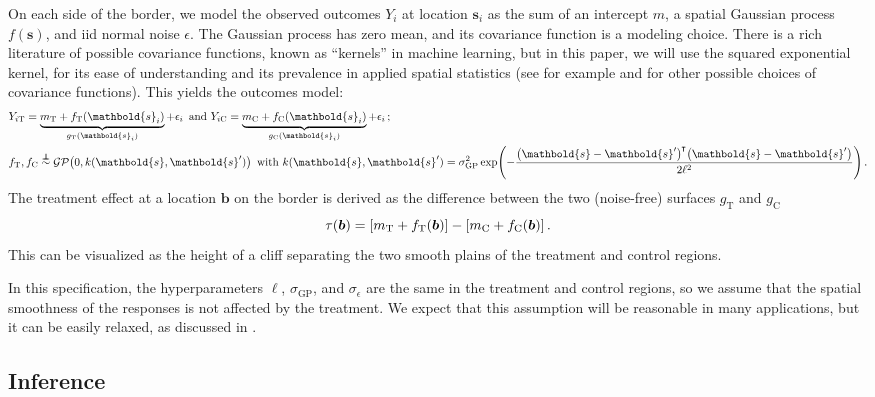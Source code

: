 \documentclass[letter,12pt]{article}
\DeclarePairedDelimiter{\parenthesis}{\lparen}{\rparen}
\DeclarePairedDelimiter{\squarebracket}{\lbrack}{\rbrack}
\newcommand{\del}[1]{\parenthesis*{#1}}
\newcommand{\sbr}[1]{\squarebracket*{#1}}
\DeclareMathOperator{\GP}{\mathcal{GP}}
\newcommand*{\trans}{^{\mkern-1.5mu\intercal}}
\newcommand{\treat}{\mathrm{T}}
\newcommand{\ctrol}{\mathrm{C}}
\newcommand{\sigmaf}{\sigma_{\mathrm{GP}}}
\newcommand{\sigman}{\sigma_{\epsilon}}
\newcommand{\svec}{\mathbold{s}}
\newcommand{\indep}{\protect\mathpalette{\protect\independenT}{\perp}}
\def\independenT#1#2{\mathrel{\rlap{$#1#2$}\mkern2mu{#1#2}}}
\newcommand{\sentinel}{\bm{b}}
\begin{document}
On each side of the border, we model the observed outcomes \(Y_i\) at location \(\svec_i\) as the sum of an intercept \(m\), a spatial Gaussian process \(f(\svec)\), and iid normal noise \(\epsilon\).
The Gaussian process has zero mean, and its covariance function is a modeling choice.
There is a rich literature of possible covariance functions, known as ``kernels'' in machine learning, but in this paper, we will use the squared exponential kernel, for its ease of understanding and its prevalence in applied spatial statistics
(see for example \cite{banerjee2014hierarchical} and \cite{rasmussen2006gaussian} for other possible choices of covariance functions).
This yields the outcomes model:
\begin{equation}
    \begin{split}
        & Y_{i\treat} = \underbrace{m_\treat{} + f_\treat{}(\svec_i)}_{g_\treat{}(\svec_i)} + \epsilon_i \,\text{ and }
        Y_{i\ctrol} = \underbrace{m_\ctrol{} + f_\ctrol{}(\svec_i)}_{g_\ctrol{}(\svec_i)} + \epsilon_i \,; \\
        & f_\treat{}, f_\ctrol{} \overset{\indep}{\sim} \GP\del{0, k(\svec, \svec')} \,\text{ with }
        k(\svec,\svec') = \sigmaf^2 \exp\del{ - \frac{\del{\svec-\svec'}\trans\del{\svec-\svec'}}{2 \ell^2}} \,.
    \end{split}
    \label{eq:spec2gp}
\end{equation}
The treatment effect at a location \(\sentinel\) on the border is derived as the difference between the two (noise-free) surfaces \(g_\treat{}\) and \(g_\ctrol{}\)
\begin{equation}
    \tau(\sentinel) = \sbr{m_\treat{} + f_\treat{}(\sentinel)} - \sbr{m_\ctrol{} + f_\ctrol{}(\sentinel)}\,.
\end{equation}
This can be visualized as the height of a cliff separating the two smooth plains of the treatment and control regions.

In this specification, the hyperparameters \(\ell\), \(\sigmaf\), and \(\sigman\) are the same in the treatment and control regions, so we assume that the spatial smoothness of the responses is not affected by the treatment.
We expect that this assumption will be reasonable in many applications, but it can be easily relaxed, as discussed in \cite{Branson:2017qy}.



\hypertarget{inference}{%
\subsection{Inference}\label{sec:inference}}
\end{document}
